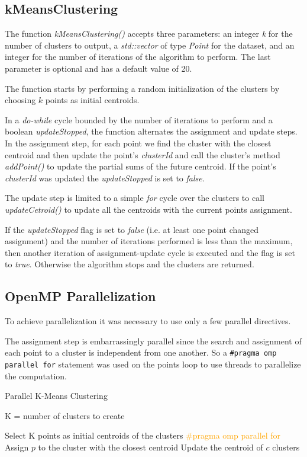 \documentclass[10pt,twocolumn,letterpaper]{article}
\begin{document}
\subsection{kMeansClustering}
The function \textit{kMeansClustering()} accepts three parameters: an integer \textit{k} for the number of clusters to output, a \textit{std::vector} of type \textit{Point} for the dataset, and an integer for the number of iterations of the algorithm to perform. The last parameter is optional and has a default value of 20.

The function starts by performing a random initialization of the clusters by choosing $k$ points as initial centroids.

In a \textit{do-while} cycle bounded by the number of iterations to perform and a boolean \textit{updateStopped}, the function alternates the assignment and update steps.
In the assignment step, for each point we find the cluster with the closest centroid and then update the point's \textit{clusterId} and call the cluster's method \textit{addPoint()} to update the partial sums of the future centroid.
If the point's \textit{clusterId} was updated the \textit{updateStopped} is set to \textit{false}.

The update step is limited to a simple \textit{for} cycle over the clusters to call \textit{updateCetroid()} to update all the centroids with the current points assignment. 

If the \textit{updateStopped} flag is set to \textit{false} (i.e. at least one point changed assignment) and the number of iterations performed is less than the maximum, then another iteration of assignment-update cycle is executed and the flag is set to \textit{true}. Otherwise the algorithm stops and the clusters are returned.

\subsection{OpenMP Parallelization}
To achieve parallelization it was necessary to use only a few parallel directives.

The assignment step is embarrassingly parallel since the search and assignment of each point to a cluster is independent from one another.
So a \verb"#pragma omp parallel for" statement was used on the points loop to use threads to parallelize the computation.

\begin{algorithm}
	\label{alg:KMeansAlgParallel}
	\caption{Parallel K-Means Clustering}
	\begin{algorithmic}
		\Require K = number of clusters to create
		\vspace{0.5cm}
		
		\State Select K points as initial centroids of the clusters
		\State \textcolor{orange}{\#pragma omp parallel for}
		\State Assign $p$ to the cluster with the closest centroid
		\EndFor
		\State Update the centroid of $c$
		\EndFor
		\EndWhile
		\State \Return clusters
		
	\end{algorithmic}
\end{algorithm}
\end{document}
